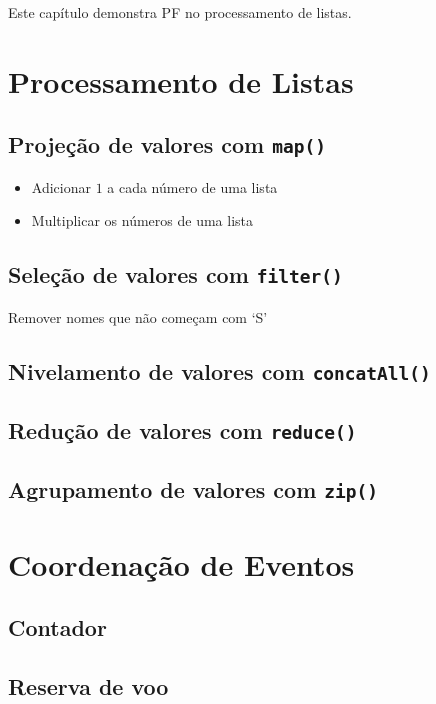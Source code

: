 Este capítulo demonstra PF no processamento de listas.

\section{Processamento de Listas}
\label{sec:orgb5510fd}
\subsection{Projeção de valores com \texttt{map()}}
\label{sec:org208eb24}
\begin{itemize}
\item Adicionar \(1\) a cada número de uma lista
\item Multiplicar os números de uma lista
\end{itemize}

\subsection{Seleção de valores com \texttt{filter()}}
\label{sec:org9b45916}
Remover nomes que não começam com ‘S’

\subsection{Nivelamento de valores com \texttt{concatAll()}}
\label{sec:org51676f4}
\subsection{Redução de valores com \texttt{reduce()}}
\label{sec:org98ad5ae}
\subsection{Agrupamento de valores com \texttt{zip()}}
\label{sec:orgae8a5ed}

\section{Coordenação de Eventos}
\label{sec:org9b51ab3}
\subsection{Contador}
\label{sec:org8a9541c}
\subsection{Reserva de voo}
\label{sec:org566a902}
